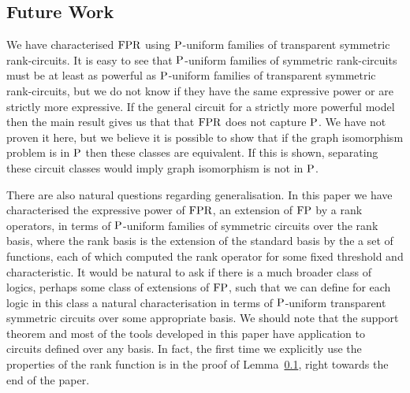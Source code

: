 \documentclass[../paper.tex]{subfiles}
\begin{document}
\subsection{Future Work}
We have characterised $\text{\upshape FPR}$ using $\mathrm{P}$-uniform families of transparent
symmetric rank-circuits. It is easy to see that $\mathrm{P}$-uniform families of
symmetric rank-circuits must be at least as powerful as $\mathrm{P}$-uniform families
of transparent symmetric rank-circuits, but we do not know if they have the same
expressive power or are strictly more expressive. If the general circuit for a
strictly more powerful model then the main result gives us that that $\text{\upshape FPR}$ does
not capture $\mathrm{P}$. We have not proven it here, but we believe it is possible to
show that if the graph isomorphism problem is in $\mathrm{P}$ then these classes are
equivalent. If this is shown, separating these circuit classes would imply graph
isomorphism is not in $\mathrm{P}$.

There are also natural questions regarding generalisation. In this paper we have
characterised the expressive power of $\text{\upshape FPR}$, an extension of $\text{\upshape FP}$ by a rank
operators, in terms of $\mathrm{P}$-uniform families of symmetric circuits over the
rank basis, where the rank basis is the extension of the standard basis by the a
set of functions, each of which computed the rank operator for some fixed
threshold and characteristic. It would be natural to ask if there is a much
broader class of logics, perhaps some class of extensions of $\text{\upshape FP}$, such that we
can define for each logic in this class a natural characterisation in terms of
$\mathrm{P}$-uniform transparent symmetric circuits over some appropriate basis. We
should note that the support theorem and most of the tools developed in this
paper have application to circuits defined over any basis. In fact, the first
time we explicitly use the properties of the rank function is in the proof of
Lemma~\ref{}, right towards the end of the paper.
\end{document}
